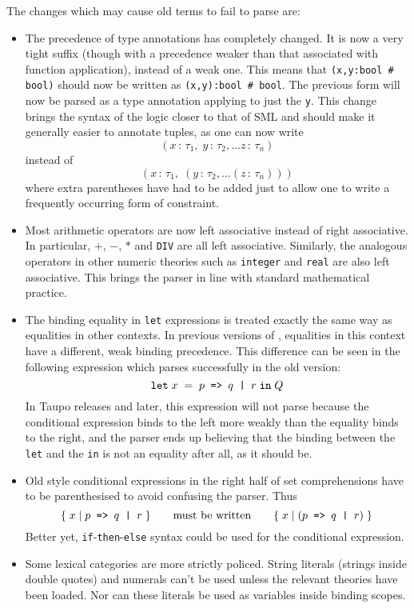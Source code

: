 {The changes which may cause old terms to fail to parse are:
\begin{itemize}
\newcommand\condexp{\holtxt{$p$ => $q$ | $r$}}
\item The precedence of type annotations has completely changed.  It
  is now a very tight suffix (though with a precedence weaker than
  that associated with function application), instead of a weak one.
  This means that \mbox{\tt (x,y:bool \# bool)} should now be written
  as \mbox{\tt (x,y):bool \# bool}. The previous form will now be
  parsed as a type annotation applying to just the \verb+y+.  This
  change brings the syntax of the logic closer to that of SML and
  should make it generally easier to annotate tuples, as one can now
  write \[ (x\,:\,\tau_1,\;y\,:\,\tau_2,\dots z\,:\,\tau_n)
  \] instead of \[
  (x\,:\,\tau_1, \;(y\,:\,\tau_2, \dots (z\,:\,\tau_n)))
  \] where extra parentheses have had to be added just to allow one to
  write a frequently occurring form of constraint.
\item Most arithmetic operators are now left associative instead of
  right associative.  In particular, $+$, $-$, $*$ and {\tt DIV} are
  all left associative.  Similarly, the analogous operators in other
  numeric theories such as {\tt integer} and {\tt real} are also left
  associative.  This brings the \HOL{} parser in line with standard
  mathematical practice.
\item The binding equality in {\tt let} expressions is treated exactly
  the same way as equalities in other contexts.  In previous versions
  of \HOL, equalities in this context have a different, weak binding
  precedence.  This difference can be seen in the following expression
  which parses successfully in the old version:
  \[ {\tt let} \; x \; = \; \condexp \; {\tt
  in} \;Q \] In Taupo releases and later, this expression will not
  parse because the conditional expression binds to the left more
  weakly than the equality binds to the right, and the parser ends up
  believing that the binding between the \verb+let+ and the \verb+in+
  is not an equality after all, as it should be.
\item Old style conditional expressions in the right half of set
  comprehensions have to be parenthesised to avoid confusing the
  parser.  Thus \[
  \{ \; x \; | \; \condexp \; \}
   \qquad\mbox{must be written} \qquad
  \{ \; x \; | \; (\condexp) \; \}
  \] Better yet, {\tt if}-{\tt then}-{\tt else} syntax could be used
  for the conditional expression.
\item Some lexical categories are more strictly policed.  String
  literals (strings inside double quotes) and numerals can't be used
  unless the relevant theories have been loaded.  Nor can these
  literals be used as variables inside binding scopes.
\end{itemize}


}
